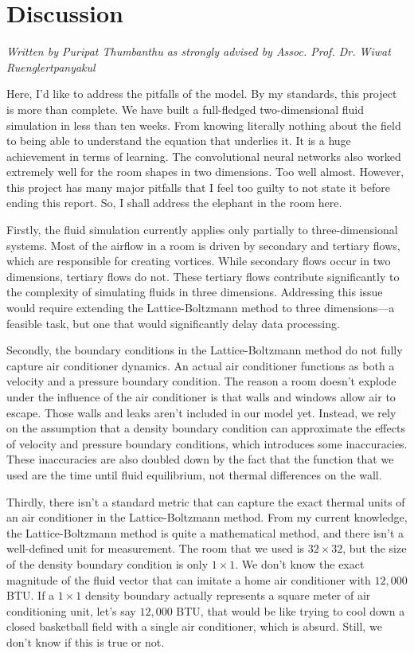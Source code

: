 \section{Discussion}

{\small \emph{Written by Puripat Thumbanthu as strongly advised by Assoc. Prof. Dr. Wiwat Ruenglertpanyakul}}

Here, I'd like to address the pitfalls of the model. By my standards, this project is more than complete. We have built a full-fledged two-dimensional fluid simulation in less than ten weeks. From knowing literally nothing about the field to being able to understand the equation that underlies it. It is a huge achievement in terms of learning. The convolutional neural networks also worked extremely well for the room shapes in two dimensions. Too well almost. However, this project has many major pitfalls that I feel too guilty to not state it before ending this report. So, I shall address the elephant in the room here.

Firstly, the fluid simulation currently applies only partially to three-dimensional systems. Most of the airflow in a room is driven by secondary and tertiary flows, which are responsible for creating vortices. While secondary flows occur in two dimensions, tertiary flows do not. These tertiary flows contribute significantly to the complexity of simulating fluids in three dimensions. Addressing this issue would require extending the Lattice-Boltzmann method to three dimensions—a feasible task, but one that would significantly delay data processing.

Secondly, the boundary conditions in the Lattice-Boltzmann method do not fully capture air conditioner dynamics. An actual air conditioner functions as both a velocity and a pressure boundary condition. The reason a room doesn't explode under the influence of the air conditioner is that walls and windows allow air to escape. Those walls and leaks aren't included in our model yet. Instead, we rely on the assumption that a density boundary condition can approximate the effects of velocity and pressure boundary conditions, which introduces some inaccuracies. These inaccuracies are also doubled down by the fact that the function that we used are the time until fluid equilibrium, not thermal differences on the wall.

Thirdly, there isn't a standard metric that can capture the exact thermal units of an air conditioner in the Lattice-Boltzmann method. From my current knowledge, the Lattice-Boltzmann method is quite a mathematical method, and there isn't a well-defined unit for measurement. The room that we used is $32\times 32$, but the size of the density boundary condition is only $1\times 1$. We don't know the exact magnitude of the fluid vector that can imitate a home air conditioner with $12,000$ BTU. If a $1\times 1$ density boundary actually represents a square meter of air conditioning unit, let's say $12,000$ BTU, that would be like trying to cool down a closed basketball field with a single air conditioner, which is absurd. Still, we don't know if this is true or not.

